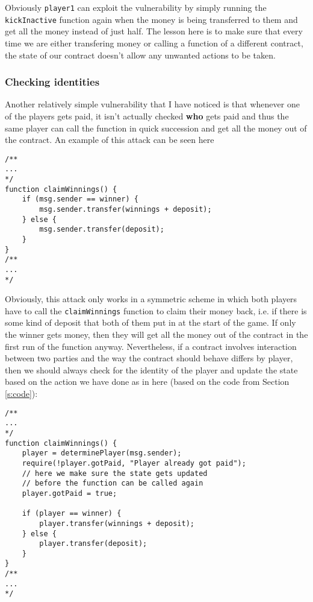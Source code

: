 \documentclass{article}
\begin{document}
    \noindent Obviously \verb|player1| can exploit the
    vulnerability by simply running the \verb|kickInactive|
    function again when the money is being transferred to
    them and get all the money instead of just half. The
    lesson here is to make sure that every time we are
    either transfering money or calling a function of a
    different contract, the state of our contract doesn't
    allow any unwanted actions to be taken.

    \subsubsection{Checking identities}
    Another relatively simple vulnerability that I have
    noticed is that whenever one of the players gets paid,
    it isn't actually checked {\bfseries who} gets paid and
    thus the same player can call the function in quick
    succession and get all the money out of the contract. An
    example of this attack can be seen here

    \begin{lstlisting}[language=Solidity]
/**
...
*/
function claimWinnings() {
    if (msg.sender == winner) {
        msg.sender.transfer(winnings + deposit);
    } else {
        msg.sender.transfer(deposit);
    }
}
/**
...
*/
    \end{lstlisting}

    \noindent Obviously, this attack only works in a
    symmetric scheme in which both players have to call the
    \verb|claimWinnings| function to claim their money back,
    i.e. if there is some kind of deposit that both of them
    put in at the start of the game. If only the winner gets
    money, then they will get all the money out of the
    contract in the first run of the function anyway.
    Nevertheless, if a contract involves interaction between
    two parties and the way the contract should behave
    differs by player, then we should always check for the
    identity of the player and update the state based on the
    action we have done as in here (based on the code from
    Section \ref{s:code}):
    
    \begin{lstlisting}[language=Solidity]
/**
...
*/
function claimWinnings() {
    player = determinePlayer(msg.sender);
    require(!player.gotPaid, "Player already got paid");
    // here we make sure the state gets updated
    // before the function can be called again
    player.gotPaid = true;

    if (player == winner) {
        player.transfer(winnings + deposit);
    } else {
        player.transfer(deposit);
    }
}
/**
...
*/
    \end{lstlisting}
\end{document}
